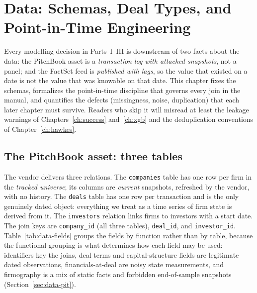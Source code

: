 \chapter{Data: Schemas, Deal Types, and Point-in-Time Engineering}
\label{ch:data}

Every modelling decision in Parts~I--III is downstream of two facts about the data: the
PitchBook asset is a \emph{transaction log with attached snapshots}, not a panel; and the
FactSet feed is \emph{published with lags}, so the value that existed on a date is not the
value that was knowable on that date. This chapter fixes the schemas, formalizes the
point-in-time discipline that governs every join in the manual, and quantifies the defects
(missingness, noise, duplication) that each later chapter must survive. Readers who skip
it will misread at least the leakage warnings of Chapters~\ref{ch:success}
and~\ref{ch:xgb} and the deduplication conventions of Chapter~\ref{ch:hawkes}.

\section{The PitchBook asset: three tables}
\label{sec:data-pitchbook}

The vendor delivers three relations. The \texttt{companies} table has one row per firm in
the \emph{tracked universe}; its columns are \emph{current} snapshots, refreshed by the
vendor, with no history. The \texttt{deals} table has one row per transaction and is the
only genuinely dated object: everything we treat as a time series of firm state is derived
from it. The \texttt{investors} relation links firms to investors with a start date. The
join keys are \texttt{company\_id} (all three tables), \texttt{deal\_id}, and
\texttt{investor\_id}. Table~\ref{tab:data-fields} groups the fields by function rather
than by table, because the functional grouping is what determines how each field may be
used: identifiers key the joins, deal terms and capital-structure fields are legitimate
dated observations, financials-at-deal are noisy state measurements, and firmography is a
mix of static facts and forbidden end-of-sample snapshots
(Section~\ref{sec:data-pit}).

